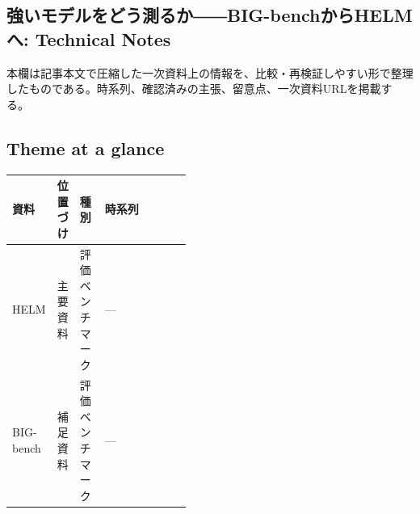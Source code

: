 \subsection*{強いモデルをどう測るか――BIG-benchからHELMへ: Technical Notes}
本欄は記事本文で圧縮した一次資料上の情報を、比較・再検証しやすい形で整理したものである。時系列、確認済みの主張、留意点、一次資料URLを掲載する。
\medskip
\subsection*{Theme at a glance}
\begin{center}
\footnotesize
\begin{tabularx}{\linewidth}{@{}p{0.20\linewidth}p{0.10\linewidth}p{0.14\linewidth}X@{}}
\toprule
資料 & 位置づけ & 種別 & 時系列 \\
\midrule
HELM & 主要資料 & 評価ベンチマーク & — \\
BIG-bench & 補足資料 & 評価ベンチマーク & — \\
\bottomrule
\end{tabularx}
\end{center}
\normalsize


